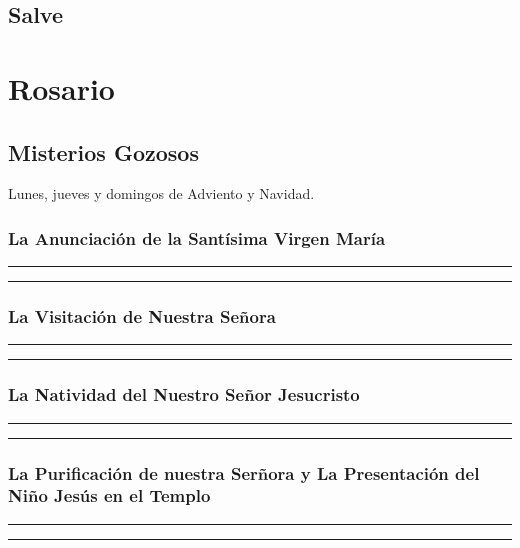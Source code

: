 \documentclass[11pt,a4paper]{book}
\begin{document}
    \section{Salve}\label{sec:salve}
    

    \chapter{Rosario}

    
    
    \section{Misterios Gozosos}
    Lunes, jueves y domingos de Adviento y Navidad.

    \subsection{La Anunciación de la Santísima Virgen María}
    
    
    \rule{\textwidth}{0.5pt}
    
    \rule{\textwidth}{0.5pt}
    

    \subsection{La Visitación de Nuestra Señora}
    
    
    \rule{\textwidth}{0.5pt}
    
    \rule{\textwidth}{0.5pt}
    

    \subsection{La Natividad del Nuestro Señor Jesucristo}
    
    
    \rule{\textwidth}{0.5pt}
    
    \rule{\textwidth}{0.5pt}
    

    \subsection{La Purificación de nuestra Serñora y La Presentación del Niño Jesús en el Templo}
    
    
    \rule{\textwidth}{0.5pt}
    
    \rule{\textwidth}{0.5pt}
    
\end{document}
